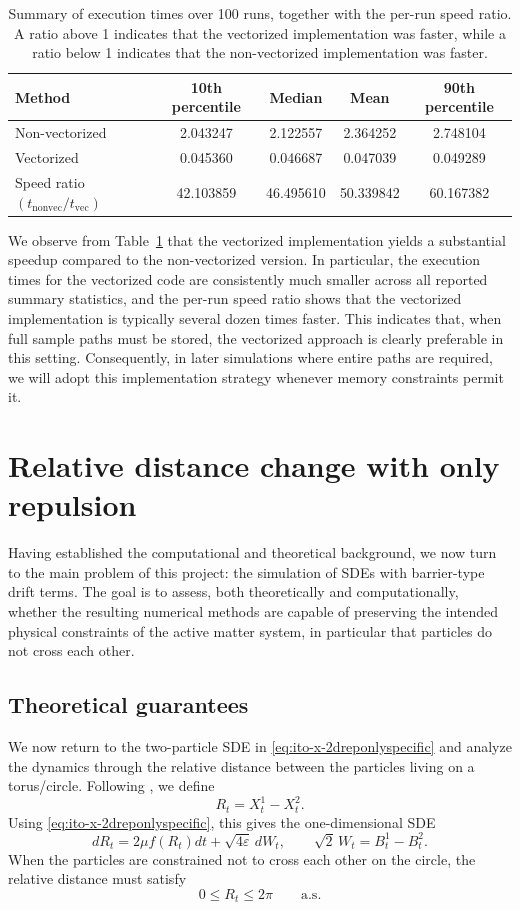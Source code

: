 \documentclass[11pt]{article}
\newcommand{\1}{\mathbbm{1}}
\theoremstyle{plain}
\theoremstyle{definition}
\theoremstyle{remark}
\begin{document}
\begin{table}[h]
\centering
\begin{tabular}{lcccc}
\toprule
Method & 10th percentile & Median & Mean & 90th percentile \\
\midrule
Non-vectorized & 2.043247 & 2.122557 & 2.364252 & 2.748104 \\
Vectorized & 0.045360 & 0.046687 & 0.047039 & 0.049289 \\
Speed ratio $(t_{\mathrm{nonvec}}/t_{\mathrm{vec}})$ & 42.103859 & 46.495610 & 50.339842 & 60.167382 \\
\bottomrule
\end{tabular}
\caption{Summary of execution times over 100 runs, together with the per-run speed ratio. A ratio above 1 indicates that the vectorized implementation was faster, while a ratio below 1 indicates that the non-vectorized implementation was faster.}
\label{tab:timing-summary}
\end{table}
\FloatBarrier
We observe from Table~\ref{tab:timing-summary} that the vectorized implementation yields a substantial speedup compared to the non-vectorized version. In particular, the execution times for the vectorized code are consistently much smaller across all reported summary statistics, and the per-run speed ratio shows that the vectorized implementation is typically several dozen times faster. This indicates that, when full sample paths must be stored, the vectorized approach is clearly preferable in this setting. Consequently, in later simulations where entire paths are required, we will adopt this implementation strategy whenever memory constraints permit it.


\newpage

\section{Relative distance change with only repulsion}


Having established the computational and theoretical background, we now turn to the main problem of this project: the simulation of SDEs with barrier-type drift terms. The goal is to assess, both theoretically and computationally, whether the resulting numerical methods are capable of preserving the intended physical constraints of the active matter system, in particular that particles do not cross each other.

\subsection{Theoretical guarantees}
We now return to the two-particle SDE in \eqref{eq:ito-x-2dreponlyspecific} and analyze the dynamics through the relative distance between the particles living on a torus/circle. Following \citet{boffi2024deep}, we define
\[
R_t = X_t^1 - X_t^2.
\]
Using \eqref{eq:ito-x-2dreponlyspecific}, this gives the one-dimensional SDE
\[
dR_t = 2\mu f(R_t)dt + \sqrt{4\varepsilon}\,dW_t,
\qquad
\sqrt{2}\,W_t = B_t^1 - B_t^2.
\]
When the particles are constrained not to cross each other on the circle, the relative distance must satisfy
\[
0 \leq R_t \leq 2\pi
\qquad \text{a.s.}
\]
\end{document}
